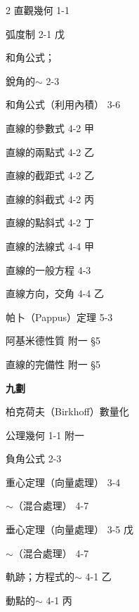 \begin{multicols}{2}
\noindent 直觀幾何 \hfill 1-1\par
\noindent 弧度制 \hfill 2-1 戊\par
\noindent 和角公式；\par
\noindent\hspace*{1.5em} 銳角的$\sim$ \hfill 2-3\par
\noindent 和角公式（利用內積） \hfill 3-6\par
\noindent 直線的參數式 \hfill 4-2 甲\par
\noindent 直線的兩點式 \hfill 4-2 乙\par
\noindent 直線的截距式 \hfill 4-2 乙\par
\noindent 直線的斜截式 \hfill 4-2 丙\par
\noindent 直線的點斜式 \hfill 4-2 丁\par
\noindent 直線的法線式 \hfill 4-4 甲\par
\noindent 直線的一般方程 \hfill 4-3\par
\noindent 直線方向，交角 \hfill 4-4 乙\par
\noindent 帕卜（Pappus）定理 \hfill 5-3\par
\noindent 阿基米德性質 \hfill 附一 \S 5\par
\noindent 直線的完備性 \hfill 附一 \S 5\par

\vspace{0.8em}
\begin{center}
\textbf{\large 九\quad 劃}
\end{center}

\noindent 柏克荷夫（Birkhoff）數量化\par
\noindent\hspace*{1.5em} 公理幾何 \hfill 1-1 附一\par
\noindent 負角公式 \hfill 2-3\par
\noindent 重心定理（向量處理） \hfill 3-4\par
\noindent\hspace*{1.5em} $\sim$（混合處理） \hfill 4-7\par
\noindent 垂心定理（向量處理） \hfill 3-5 戊\par
\noindent\hspace*{1.5em} $\sim$（混合處理） \hfill 4-7\par
\noindent 軌跡；方程式的$\sim$ \hfill 4-1 乙\par
\noindent\hspace*{1.5em} 動點的$\sim$ \hfill 4-1 丙\par


\end{multicols}
